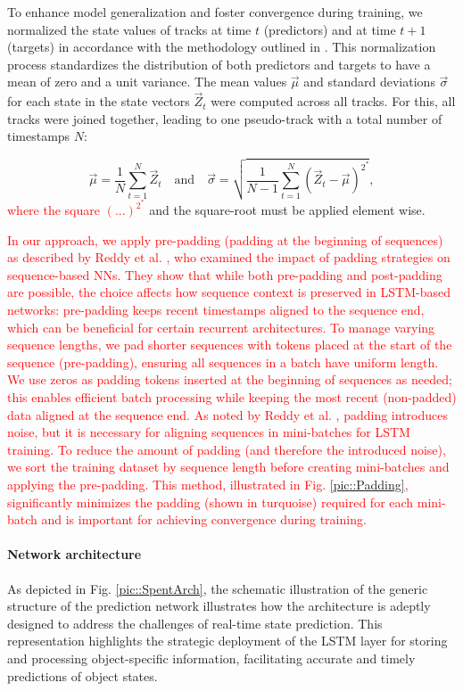 \documentclass[letterpaper, 10 pt, journal, twoside]{IEEEtran}
\newcommand{\red}[1]{\textcolor{red}{#1}}
\begin{document}
To enhance model generalization and foster convergence during training, we normalized the state values of tracks at time $t$ (predictors) and at time $t+1$ (targets) in accordance with the methodology outlined in {\cite{DL_book.2019}}.
This normalization process standardizes the distribution of both predictors and targets to have a mean of zero and a unit variance.
The mean values $\vec{\mu}$ and standard deviations $\vec{\sigma}$ for each state in the state vectors $\vec{Z}_t$ were computed across all tracks. For this, all tracks were joined together, leading to one pseudo-track with a total number of timestamps $N$:

\begin{equation}
	\vec{\mu} = \frac{1}{N} \sum_{t = 1}^{N} \vec{Z}_t
\quad\text{and}\quad
	\vec{\sigma} = \sqrt{{\frac{1}{N - 1}} \sum_{t = 1}^{N} (\vec{Z}_t - \vec{\mu})^{2^*}},
\end{equation}
\noindent
\red{where the square $(...)^{2^*}$} and the square-root must be applied element wise.

\red{In our approach, we apply pre-padding (padding at the beginning of sequences) as described by Reddy et al. {\cite{DL_padding.2019}}, who examined the impact of padding strategies on sequence-based \acp{NN}.
They show that while both pre-padding and post-padding are possible, the choice affects how sequence context is preserved in \ac{LSTM}-based networks: pre-padding keeps recent timestamps aligned to the sequence end, which can be beneficial for certain recurrent architectures.
To manage varying sequence lengths, we pad shorter sequences with tokens placed at the start of the sequence (pre-padding), ensuring all sequences in a batch have uniform length.
We use zeros as padding tokens inserted at the beginning of sequences as needed; this enables efficient batch processing while keeping the most recent (non-padded) data aligned at the sequence end.
As noted by Reddy et al. {\cite{DL_padding.2019}}, padding introduces noise, but it is necessary for aligning sequences in mini-batches for \ac{LSTM} training. To reduce the amount of padding (and therefore the introduced noise), we sort the training dataset by sequence length before creating mini-batches and applying the pre-padding. This method, illustrated in Fig. {\ref{pic::Padding}}, significantly minimizes the padding (shown in turquoise) required for each mini-batch and is important for achieving convergence during training.}

\paragraph{Network architecture}
As depicted in Fig. \ref{pic::SpentArch}, the schematic illustration of the generic structure of the prediction network illustrates how the architecture is adeptly designed to address the challenges of real-time state prediction.
This representation highlights the strategic deployment of the \ac{LSTM} layer for storing and processing object-specific information, facilitating accurate and timely predictions of object states.
\end{document}
